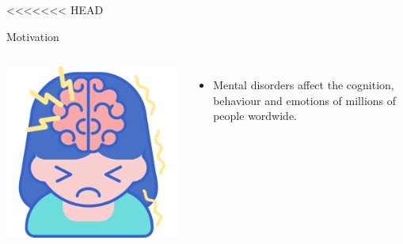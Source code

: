 \documentclass[spanish, aspectratio=169]{beamer}
\begin{document}
	
	
\frame{\titlepage}

<<<<<<< HEAD
\begin{frame}{Motivation}
\begin{columns}
	\centering
	\includegraphics[scale=0.3]{figures/metal_disorders.png}
	
	
	\begin{itemize}
		\item Mental disorders affect the cognition, behaviour and emotions of millions of people wordwide.
	\end{itemize}
	
\end{columns}
\end{frame}	
	
\end{document}
